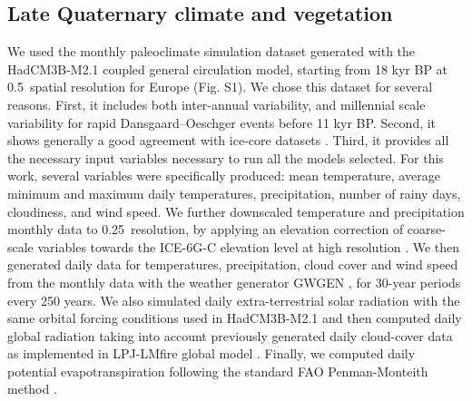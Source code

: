 \documentclass[9pt,twocolumn,twoside]{pnas-new}
\begin{document}
{\subsection*{Late Quaternary climate and vegetation}\label{paleodata}
We used the monthly paleoclimate simulation dataset \cite{Armstrong2019} generated with the HadCM3B-M2.1 coupled general circulation model, starting from 18 kyr BP at 0.5\degree~spatial resolution for Europe (Fig. S1). We chose this dataset for several reasons. First, it includes both inter-annual variability, and millennial scale variability for rapid Dansgaard–Oeschger events before 11 kyr BP. Second, it shows generally a good agreement with ice-core datasets \cite{Armstrong2019}. Third, it provides all the necessary input variables necessary to run all the models selected.  For this work, several variables were specifically produced: mean temperature, average minimum and maximum daily temperatures, precipitation, number of rainy days, cloudiness, and wind speed. We further downscaled temperature and precipitation monthly data to 0.25\degree~resolution, by applying an elevation correction of coarse-scale variables towards the ICE-6G-C elevation level at high resolution \cite{Peltier2015}.  
We then generated daily data for temperatures, precipitation, cloud cover and wind speed from  the monthly data with the weather generator GWGEN \cite{Sommer2017}, for 30-year periods every 250 years. We also simulated daily extra-terrestrial solar radiation with the same orbital forcing conditions used in HadCM3B-M2.1 \cite{Armstrong2019} and then computed daily global radiation taking into account previously generated daily cloud-cover data as implemented in LPJ-LMfire global model \cite{Pfeiffer2013}. Finally, we computed daily potential evapotranspiration following the standard FAO Penman-Monteith method \cite{Allen1998}.  

}
\end{document}
